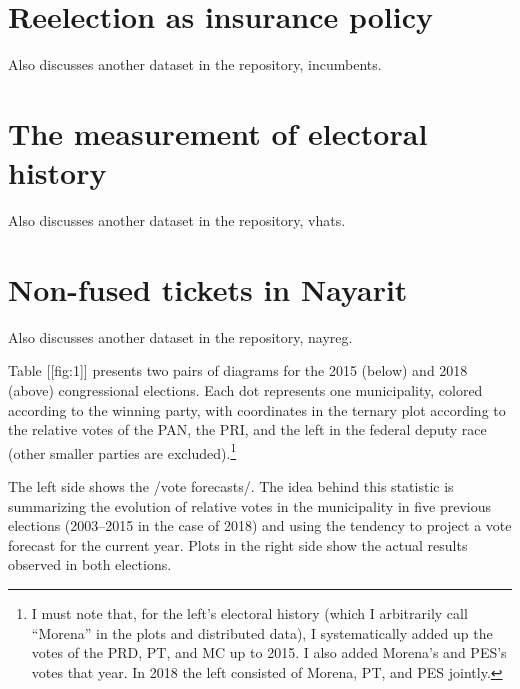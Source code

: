 \documentclass[letter,12pt]{article}
\begin{document}
\section{Reelection as insurance policy}
Also discusses another dataset in the repository, incumbents.

\section{The measurement of electoral history}
Also discusses another dataset in the repository, vhats.

\section{Non-fused tickets in Nayarit}
Also discusses another dataset in the repository, nayreg.

Table [[fig:1]] presents two pairs of diagrams for the 2015 (below) and 2018 (above) congressional elections. Each dot represents one municipality, colored according to the winning party, with coordinates in the ternary plot according to the relative votes of the PAN, the PRI, and the left in the federal deputy race (other smaller parties are excluded).\footnote{I must note that, for the left's electoral history (which I arbitrarily call ``Morena'' in the plots and distributed data), I systematically added up the votes of the PRD, PT, and MC up to 2015. I also added Morena's and PES's votes that year. In 2018 the left consisted of Morena, PT, and PES jointly.} 


The left side shows the /vote forecasts/. The idea behind this statistic is summarizing the evolution of relative votes in the municipality in five previous elections (2003--2015 in the case of 2018) and using the tendency to project a vote forecast for the current year. Plots in the right side show the actual results observed in both elections.
\end{document}
